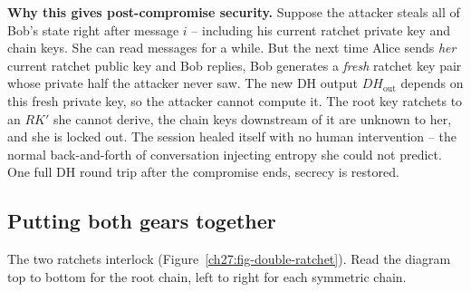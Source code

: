 \begin{whybox}
\textbf{Why this gives post-compromise security.} Suppose the attacker steals all of Bob's state right after message $i$ -- including his current ratchet private key and chain keys. She can read messages for a while. But the next time Alice sends \emph{her} current ratchet public key and Bob replies, Bob generates a \emph{fresh} ratchet key pair whose private half the attacker never saw. The new DH output $DH_{\mathrm{out}}$ depends on this fresh private key, so the attacker cannot compute it. The root key ratchets to an $RK'$ she cannot derive, the chain keys downstream of it are unknown to her, and she is locked out. The session healed itself with no human intervention -- the normal back-and-forth of conversation injecting entropy she could not predict. One full DH round trip after the compromise ends, secrecy is restored.
\end{whybox}

\subsection{Putting both gears together}
\label{ch27:both-ratchets}

The two ratchets interlock (Figure~\ref{ch27:fig-double-ratchet}). Read the diagram top to bottom for the root chain, left to right for each symmetric chain.

